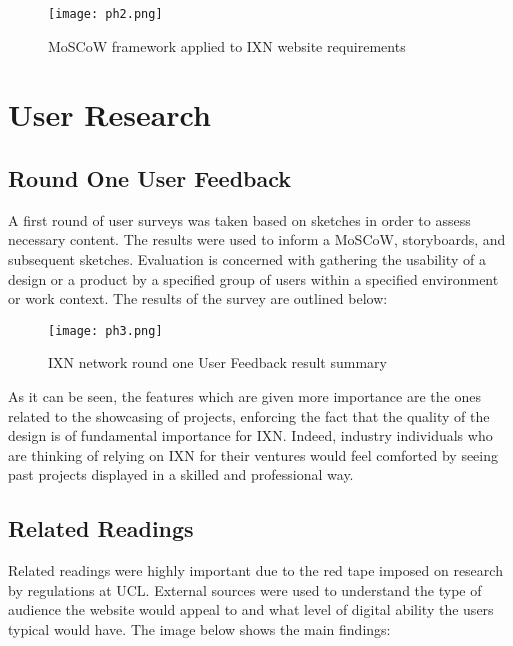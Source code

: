 \documentclass[fontsize=10pt]{extarticle}
\numberwithin{figure}{section} %
\begin{document}
\newpage

\begin{landscape}
\begin{figure}[H]
      \centering
      \texttt{[image: ph2.png]}
      \caption{MoSCoW framework applied to IXN website requirements}
 \end{figure}
 \end{landscape}

\hypertarget{user-research}{%
\section{User Research}\label{user-research}}

\hypertarget{round-one-user-feedback}{%
\subsection{Round One User Feedback}\label{round-one-user-feedback}}

A first round of user surveys was taken based on sketches in order to
assess necessary content. The results were used to inform a MoSCoW,
storyboards, and subsequent sketches. Evaluation is concerned with
gathering the usability of a design or a product by a specified group of
users within a specified environment or work context. The results of the
survey are outlined below:

\begin{figure}[H]
      \centering
      \texttt{[image: ph3.png]}
      \caption{IXN network round one User Feedback result summary}
 \end{figure}

As it can be seen, the features which are given more importance are the
ones related to the showcasing of projects, enforcing the fact that the
quality of the design is of fundamental importance for IXN. Indeed,
industry individuals who are thinking of relying on IXN for their
ventures would feel comforted by seeing past projects displayed in a
skilled and professional way.

\hypertarget{related-readings}{%
\subsection{Related Readings}\label{related-readings}}

Related readings were highly important due to the red tape imposed on
research by regulations at UCL. External sources were used to understand
the type of audience the website would appeal to and what level of
digital ability the users typical would have. The image below shows the
main findings:
\end{document}

